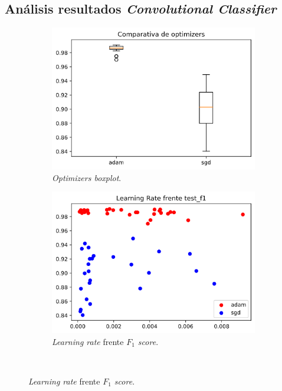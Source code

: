 \subsection{Análisis resultados \textit{Convolutional Classifier}}

\begin{figure}[H]
\begin{subfigure}[b]{.5\textwidth}
  \centering
  \includegraphics[width=.8\linewidth]{imagenes/06_Experimentacion/simplecnn/simplecnnboxplot.png}
  \caption{\textit{Optimizers boxplot}.}
  \label{fig:simplecnnoptimizers}
\end{subfigure}
\begin{subfigure}[b]{.5\textwidth}
  \centering
  \includegraphics[width=.8\linewidth]{imagenes/06_Experimentacion/simplecnn/simplecnnlr.png}  
  \caption{\textit{Learning rate} frente \textit{$F_1$ score}.}
  \label{fig:simplecnnlr}
\end{subfigure}\\


\end{figure}
